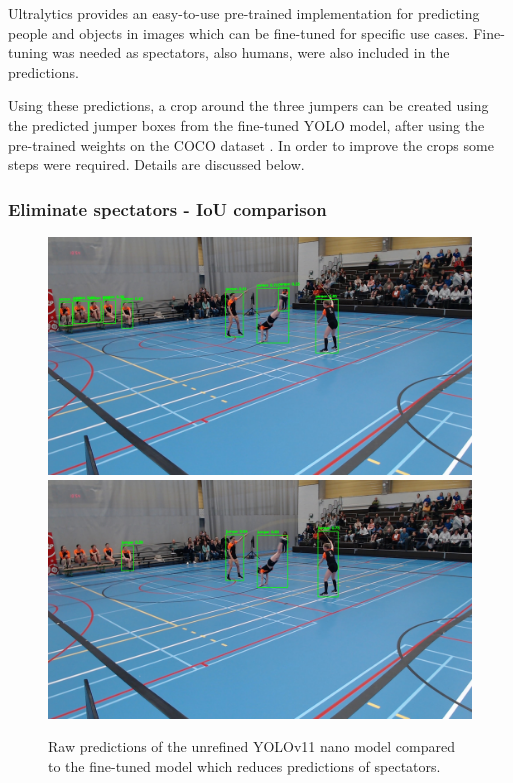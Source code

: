 Ultralytics \autocite{Khanam2024} provides an easy-to-use pre-trained implementation for predicting people and objects in images which can be fine-tuned for specific use cases. Fine-tuning was needed as spectators, also humans, were also included in the predictions.

Using these predictions, a crop around the three jumpers can be created using the predicted jumper boxes from the fine-tuned YOLO model, after using the pre-trained weights on the COCO dataset \autocite{Lin2014}. In order to improve the crops some steps were required. Details are discussed below.

\subsubsection{Eliminate spectators - IoU comparison}

\begin{figure}
    \centering
    \includegraphics[width=0.95\linewidth]{img/1267_292_boxes}
    \includegraphics[width=0.95\linewidth]{img/1267_292_boxes_reduced_spectators}
    \caption[raw vs fine-tuned YOLOv11 nano model predictions]{Raw predictions of the unrefined YOLOv11 nano model compared to the fine-tuned model which reduces predictions of spectators.}
    \label{fig:raw-vs-fine-tuned-boxes}
\end{figure}

